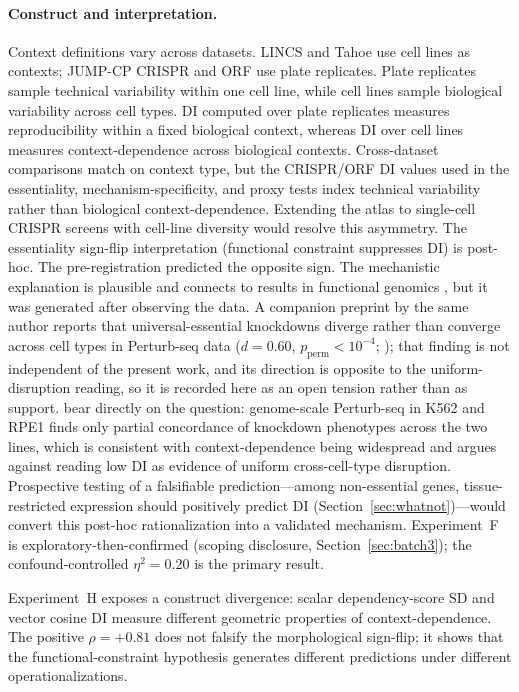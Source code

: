 \documentclass[11pt]{article}
\begin{document}
\paragraph{Construct and interpretation.}
Context definitions vary across datasets.  LINCS and Tahoe use cell
lines as contexts; JUMP-CP CRISPR and ORF use plate replicates.  Plate
replicates sample technical variability within one cell line, while cell
lines sample biological variability across cell types.  DI computed over
plate replicates measures reproducibility within a fixed biological
context, whereas DI over cell lines measures context-dependence across
biological contexts.  Cross-dataset comparisons match on context type,
but the CRISPR/ORF DI values used in the essentiality,
mechanism-specificity, and proxy tests index technical variability rather
than biological context-dependence.  Extending the atlas to single-cell
CRISPR screens with cell-line diversity \citep{tahoe2025} would resolve
this asymmetry.
The essentiality sign-flip interpretation (functional constraint
suppresses DI) is post-hoc.  The pre-registration predicted the
opposite sign.  The mechanistic explanation is plausible and connects to results in
functional genomics \citep{funk2022phenotypic, ramezani2025periscope}, but it
was generated after observing the data.  A companion preprint by the same
author reports that universal-essential knockdowns diverge rather than converge
across cell types in Perturb-seq data ($d = 0.60$,
$p_{\mathrm{perm}} < 10^{-4}$; \citealp{tower2026validity}); that finding is
not independent of the present work, and its direction is opposite to the
uniform-disruption reading, so it is recorded here as an open tension rather
than as support.  \citet{replogle2022perturbseq} bear directly on the question:
genome-scale Perturb-seq in K562 and RPE1 finds only partial concordance of
knockdown phenotypes across the two lines, which is consistent with
context-dependence being widespread and argues against reading low DI as
evidence of uniform cross-cell-type disruption.  Prospective testing of a
falsifiable prediction---among non-essential genes, tissue-restricted
expression should positively predict DI
(Section~\ref{sec:whatnot})---would convert this post-hoc
rationalization into a validated mechanism.
Experiment~F is exploratory-then-confirmed (scoping disclosure,
Section~\ref{sec:batch3}); the confound-controlled $\eta^2 = 0.20$ is
the primary result.

Experiment~H exposes a construct divergence: scalar dependency-score SD
and vector cosine DI measure different geometric properties of
context-dependence.  The positive $\rho = +0.81$ does not falsify the
morphological sign-flip; it shows that the functional-constraint
hypothesis generates different predictions under different operationalizations.
\end{document}
